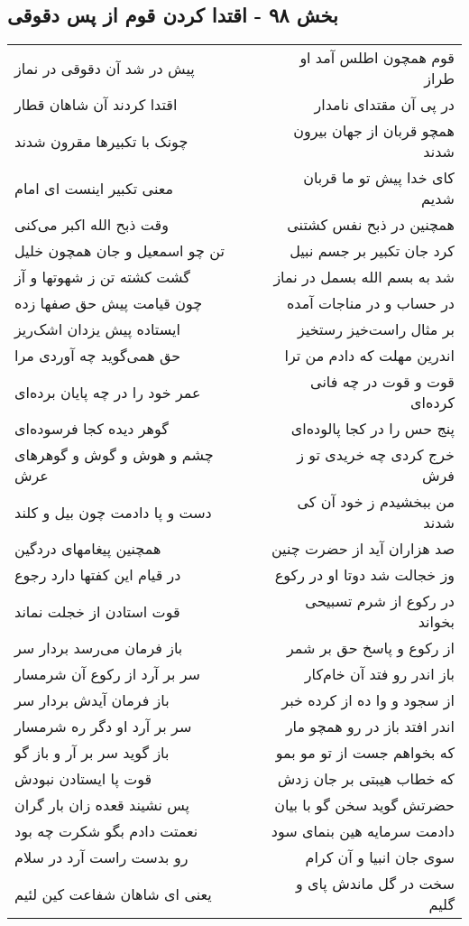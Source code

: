 \begin{center}
\section*{بخش ۹۸ - اقتدا کردن قوم از پس دقوقی}
\label{sec:sh098}
\begin{longtable}{l p{0.5cm} r}
پیش در شد آن دقوقی در نماز
&&
قوم همچون اطلس آمد او طراز
\\
اقتدا کردند آن شاهان قطار
&&
در پی آن مقتدای نامدار
\\
چونک با تکبیرها مقرون شدند
&&
همچو قربان از جهان بیرون شدند
\\
معنی تکبیر اینست ای امام
&&
کای خدا پیش تو ما قربان شدیم
\\
وقت ذبح الله اکبر می‌کنی
&&
همچنین در ذبح نفس کشتنی
\\
تن چو اسمعیل و جان همچون خلیل
&&
کرد جان تکبیر بر جسم نبیل
\\
گشت کشته تن ز شهوتها و آز
&&
شد به بسم الله بسمل در نماز
\\
چون قیامت پیش حق صفها زده
&&
در حساب و در مناجات آمده
\\
ایستاده پیش یزدان اشک‌ریز
&&
بر مثال راست‌خیز رستخیز
\\
حق همی‌گوید چه آوردی مرا
&&
اندرین مهلت که دادم من ترا
\\
عمر خود را در چه پایان برده‌ای
&&
قوت و قوت در چه فانی کرده‌ای
\\
گوهر دیده کجا فرسوده‌ای
&&
پنج حس را در کجا پالوده‌ای
\\
چشم و هوش و گوش و گوهرهای عرش
&&
خرج کردی چه خریدی تو ز فرش
\\
دست و پا دادمت چون بیل و کلند
&&
من ببخشیدم ز خود آن کی شدند
\\
همچنین پیغامهای دردگین
&&
صد هزاران آید از حضرت چنین
\\
در قیام این کفتها دارد رجوع
&&
وز خجالت شد دوتا او در رکوع
\\
قوت استادن از خجلت نماند
&&
در رکوع از شرم تسبیحی بخواند
\\
باز فرمان می‌رسد بردار سر
&&
از رکوع و پاسخ حق بر شمر
\\
سر بر آرد از رکوع آن شرمسار
&&
باز اندر رو فتد آن خام‌کار
\\
باز فرمان آیدش بردار سر
&&
از سجود و وا ده از کرده خبر
\\
سر بر آرد او دگر ره شرمسار
&&
اندر افتد باز در رو همچو مار
\\
باز گوید سر بر آر و باز گو
&&
که بخواهم جست از تو مو بمو
\\
قوت پا ایستادن نبودش
&&
که خطاب هیبتی بر جان زدش
\\
پس نشیند قعده زان بار گران
&&
حضرتش گوید سخن گو با بیان
\\
نعمتت دادم بگو شکرت چه بود
&&
دادمت سرمایه هین بنمای سود
\\
رو بدست راست آرد در سلام
&&
سوی جان انبیا و آن کرام
\\
یعنی ای شاهان شفاعت کین لئیم
&&
سخت در گل ماندش پای و گلیم
\\
\end{longtable}
\end{center}
